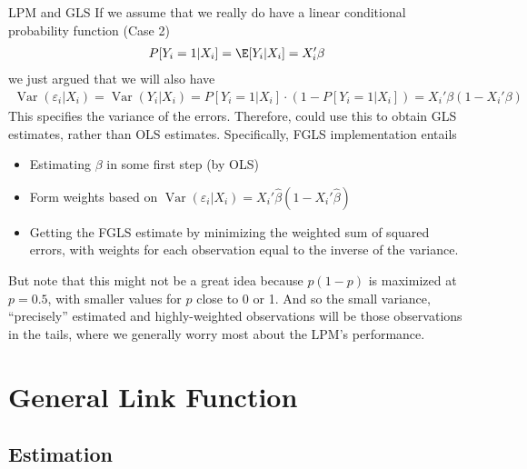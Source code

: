 \documentclass[aspectratio=169, handout]{beamer}
\newcommand{\Var}{\operatorname{Var}}
\begin{document}
{\footnotesize
\begin{frame}{LPM and GLS}
If we assume that we really do have a linear conditional probability
function (Case 2)
\begin{align*}
  P[Y_i=1|X_i]
  =
  \E[Y_i|X_i]
  =
  X_i'\beta
\end{align*}
we just argued that we will also have
\begin{align*}
  \Var(\varepsilon_i|X_i)
  =
  \Var(Y_i|X_i)
  =
  P[Y_i=1|X_i]
  \cdot
  (1- P[Y_i=1|X_i])
  =
  X_i'\beta
  (1-X_i'\beta)
\end{align*}
This specifies the variance of the errors.
Therefore, could use this to obtain \alert{GLS} estimates, rather
than OLS estimates.
Specifically, FGLS implementation entails
\begin{itemize}
  \item Estimating $\beta$ in some first step (by OLS)
  \item Form weights based on
    $\Var(\varepsilon_i|X_i)= X_i'\hat{\beta} (1-X_i'\hat{\beta})$
  \item Getting the FGLS estimate by minimizing the weighted sum of
    squared errors, with weights for each observation equal to the
    inverse of the variance.
\end{itemize}
But note that this might not be a great idea because $p(1-p)$ is
maximized at $p=0.5$, with smaller values for $p$ close to $0$ or 1.
And so the small variance, ``precisely'' estimated and highly-weighted
observations will be those observations in the tails, where we generally
worry most about the LPM's performance.
\end{frame}
}




\section{General Link Function}

\subsection{Estimation}
\end{document}
